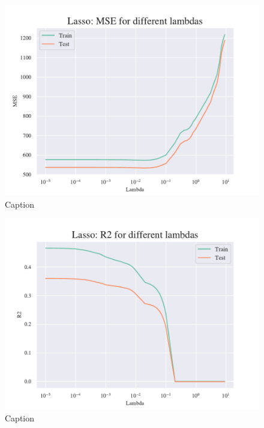 \begin{figure}
    \centering
    \includegraphics[width=1\linewidth]{project_1/figures/figures_in_appendix/Lasso_MSE_terrain.pdf}
    \caption{Caption}
    \label{fig:ref}
\end{figure}

\begin{figure}
    \centering
    \includegraphics[width=1\linewidth]{project_1/figures/figures_in_appendix/Lasso_R2_Franke_Noise.pdf}
    \caption{Caption}
    \label{fig:ref}
\end{figure}

